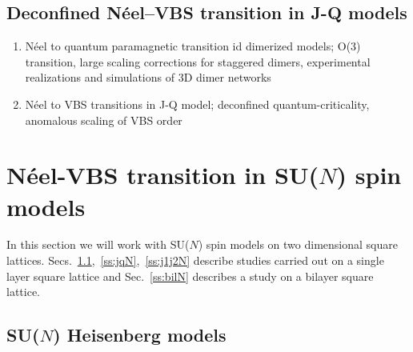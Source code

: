 \documentclass[aps,prb,groupedaddress,twocolumn]{revtex4}
\begin{document}
\subsection{Deconfined N\'eel--VBS transition in J-Q models}

\begin{enumerate}
\item N\'eel to quantum paramagnetic transition id dimerized models; O(3) transition, large scaling
corrections for staggered dimers, experimental realizations and simulations of 3D dimer networks
\item N\'eel to VBS transitions in J-Q model; deconfined quantum-criticality, anomalous scaling of VBS order
\end{enumerate}

\section{N\'eel-VBS transition in SU($N$) spin models}

In this section we will work with SU($N$) spin models on two
dimensional  square
lattices. Secs.~\ref{ss:j1N},~\ref{ss:jqN},~\ref{ss:j1j2N} describe
studies carried out on a single layer square lattice and
Sec.~\ref{ss:bilN} describes a study on a bilayer square
lattice. 

\subsection{SU($N$) Heisenberg models}
\label{ss:j1N}
\end{document}
